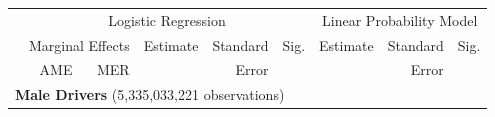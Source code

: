 \documentclass{cje}
\begin{document}
\begin{table}%
\centering 
\begin{tabular}{l r r r r l r r l} 

\hline 
 
 & \multicolumn{5}{c}{Logistic Regression}  & \multicolumn{3}{c}{Linear Probability Model} \\ 

 \cmidrule(lr){2-6}\cmidrule(lr){7-9} 
 & \multicolumn{2}{c}{Marginal Effects} & Estimate & Standard & Sig. & Estimate & Standard & Sig. \\ 

 \cmidrule(lr){2-3} 
 &   AME & MER &          &  Error   &      &          &  Error   &     \\ 

\hline 
 
\multicolumn{7}{l}{\textbf{Male Drivers} (5,335,033,221 observations)} \\ 


\end{tabular}
\end{table}
\end{document}
